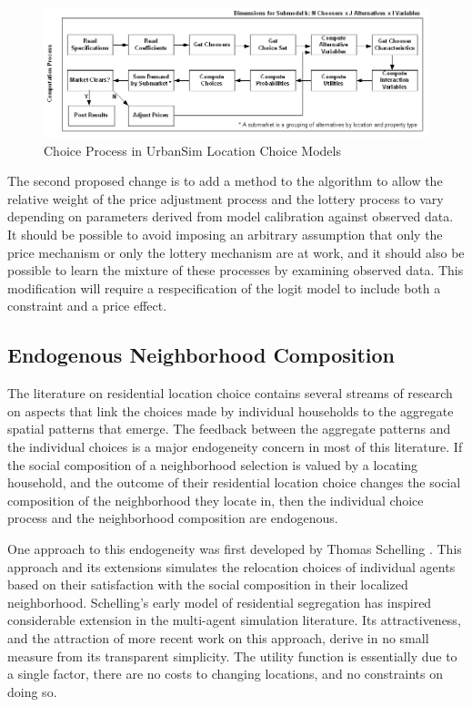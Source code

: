 \documentclass[12pt,a4paper]{article}
\begin{document}
\begin{figure}[h]
\center
 \includegraphics[width=6.5in]
 {ChoiceProcessWithPriceAdjustment.png}
\caption{Choice Process in UrbanSim Location Choice Models}
\label{fig:choiceprocess2}
\end{figure}


The second proposed change is to add a method to the algorithm to
allow the relative weight of the price adjustment process and the
lottery process to vary depending on parameters derived from model
calibration against observed data.  It should be possible to avoid
imposing an arbitrary assumption that only the price mechanism or
only the lottery mechanism are at work, and it should also be
possible to learn the mixture of these processes by examining
observed data.  This modification will require a respecification
of the logit model to include both a constraint and a price
effect.


\subsection{Endogenous Neighborhood Composition}
The literature on residential location choice contains several
streams of research on aspects that link the choices made by
individual households to the aggregate spatial patterns that
emerge.  The feedback between the aggregate patterns and the
individual choices is a major endogeneity concern in most of this
literature.  If the social composition of a neighborhood selection
is valued by a locating household, and the outcome of their
residential location choice changes the social composition of the
neighborhood they locate in, then the individual choice process
and the neighborhood composition are endogenous.

One approach to this endogeneity was first developed by Thomas
Schelling \cite{schelling-1969,schelling-1971,schelling-1978}.
This approach and its extensions simulates the relocation choices
of individual agents based on their satisfaction with the social
composition in their localized neighborhood. Schelling's early
model of residential segregation has inspired considerable
extension in the multi-agent simulation literature.  Its
attractiveness, and the attraction of more recent work on this
approach, derive in no small measure from its transparent
simplicity.  The utility function is essentially due to a single
factor, there are no costs to changing locations, and no
constraints on doing so.
\end{document}
